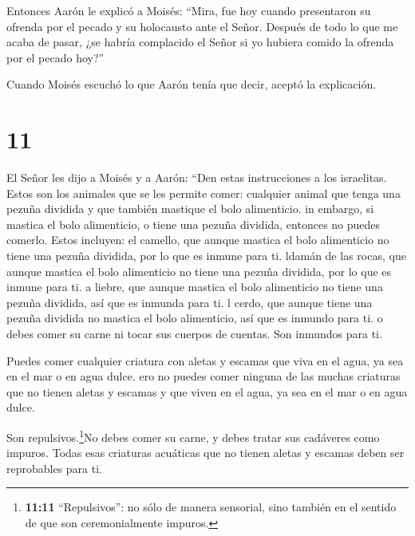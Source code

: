  Entonces Aarón le explicó a Moisés: ``Mira, fue hoy cuando
presentaron su ofrenda por el pecado y su holocausto ante el Señor.
Después de todo lo que me acaba de pasar, ¿se habría complacido el Señor
si yo hubiera comido la ofrenda por el pecado hoy?''

 Cuando Moisés escuchó lo que Aarón tenía que decir, aceptó
la explicación.

\hypertarget{section-10}{%
\section{11}\label{section-10}}

 El Señor les dijo a Moisés y a Aarón:  ``Den
estas instrucciones a los israelitas. Estos son los animales que se les
permite comer:  cualquier animal que tenga una pezuña
dividida y que también mastique el bolo alimenticio.  in
embargo, si mastica el bolo alimenticio, o tiene una pezuña dividida,
entonces no puedes comerlo. Estos incluyen: el camello, que aunque
mastica el bolo alimenticio no tiene una pezuña dividida, por lo que es
inmune para ti.  ldamán de las rocas, que aunque mastica el
bolo alimenticio no tiene una pezuña dividida, por lo que es inmune para
ti.  a liebre, que aunque mastica el bolo alimenticio no
tiene una pezuña dividida, así que es inmunda para ti.  l
cerdo, que aunque tiene una pezuña dividida no mastica el bolo
alimenticio, así que es inmundo para ti.  o debes comer su
carne ni tocar sus cuerpos de cuentas. Son inmundos para ti.

 Puedes comer cualquier criatura con aletas y escamas que
viva en el agua, ya sea en el mar o en agua dulce.  ero no
puedes comer ninguna de las muchas criaturas que no tienen aletas y
escamas y que viven en el agua, ya sea en el mar o en agua dulce.

 Son repulsivos.\footnote{\textbf{11:11} ``Repulsivos'': no
  sólo de manera sensorial, sino también en el sentido de que son
  ceremonialmente impuros.}No debes comer su carne, y debes tratar sus
cadáveres como impuros.  Todas esas criaturas acuáticas que
no tienen aletas y escamas deben ser reprobables para ti.


